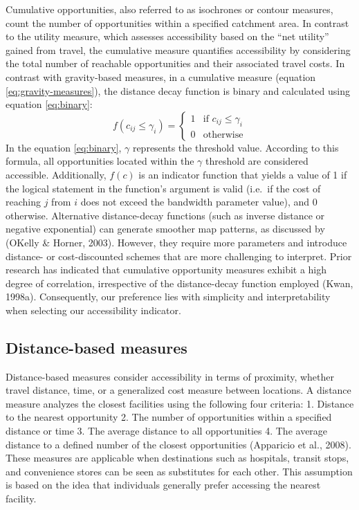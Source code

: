 \documentclass[12pt,twoside]{reedthesis}
\begin{document}
Cumulative opportunities, also referred to as isochrones or contour measures, count the number of opportunities within a specified catchment area. In contrast to the utility measure, which assesses accessibility based on the ``net utility'' gained from travel, the cumulative measure quantifies accessibility by considering the total number of reachable opportunities and their associated travel costs. In contrast with gravity-based measures, in a cumulative measure (equation \eqref{eq:gravity-measures}), the distance decay function is binary and calculated using equation \eqref{eq:binary}:
\begin{equation}
f(c_{ij} \le \gamma _i) = 
\begin{cases}
  1 & \text{if } c_{ij} \le \gamma _i \\
  0 & \text{otherwise}
\end{cases}
\label{eq:binary}
\end{equation}
In the equation \eqref{eq:binary}, \(\gamma\) represents the threshold value. According to this formula, all opportunities located within the \(\gamma\) threshold are considered accessible. Additionally, \(f(c)\) is an indicator function that yields a value of 1 if the logical statement in the function's argument is valid (i.e.~if the cost of reaching \(j\) from \(i\) does not exceed the bandwidth parameter value), and 0 otherwise. Alternative distance-decay functions (such as inverse distance or negative exponential) can generate smoother map patterns, as discussed by (OKelly \& Horner, 2003). However, they require more parameters and introduce distance- or cost-discounted schemes that are more challenging to interpret. Prior research has indicated that cumulative opportunity measures exhibit a high degree of correlation, irrespective of the distance-decay function employed (Kwan, 1998a). Consequently, our preference lies with simplicity and interpretability when selecting our accessibility indicator.

\hypertarget{distance-based-measures}{%
\subsection{Distance-based measures}\label{distance-based-measures}}

Distance-based measures consider accessibility in terms of proximity, whether travel distance, time, or a generalized cost measure between locations. A distance measure analyzes the closest facilities using the following four criteria:
1. Distance to the nearest opportunity
2. The number of opportunities within a specified distance or time
3. The average distance to all opportunities
4. The average distance to a defined number of the closest opportunities (Apparicio et al., 2008). These measures are applicable when destinations such as hospitals, transit stops, and convenience stores can be seen as substitutes for each other. This assumption is based on the idea that individuals generally prefer accessing the nearest facility.
\end{document}
